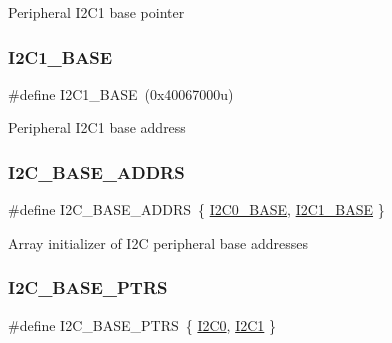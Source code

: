 Peripheral I2\+C1 base pointer \mbox{\label{group___i2_c___peripheral___access___layer_gacd72dbffb1738ca87c838545c4eb85a3}} 
\subsubsection{\texorpdfstring{I2C1\_BASE}{I2C1\_BASE}}
{\footnotesize\ttfamily \#define I2\+C1\+\_\+\+B\+A\+SE~(0x40067000u)}

Peripheral I2\+C1 base address \mbox{\label{group___i2_c___peripheral___access___layer_gae92fd6c5f532d79f1a47e76c6dbc33f0}} 
\subsubsection{\texorpdfstring{I2C\_BASE\_ADDRS}{I2C\_BASE\_ADDRS}}
{\footnotesize\ttfamily \#define I2\+C\+\_\+\+B\+A\+S\+E\+\_\+\+A\+D\+D\+RS~\{ \mbox{\hyperlink{group___i2_c___peripheral___access___layer_gabf0928baf4e4350633ca9050b65d1939}{I2\+C0\+\_\+\+B\+A\+SE}}, \mbox{\hyperlink{group___i2_c___peripheral___access___layer_gacd72dbffb1738ca87c838545c4eb85a3}{I2\+C1\+\_\+\+B\+A\+SE}} \}}

Array initializer of I2C peripheral base addresses \mbox{\label{group___i2_c___peripheral___access___layer_gaee17f364d6d1712b62774e6c33dea554}} 
\subsubsection{\texorpdfstring{I2C\_BASE\_PTRS}{I2C\_BASE\_PTRS}}
{\footnotesize\ttfamily \#define I2\+C\+\_\+\+B\+A\+S\+E\+\_\+\+P\+T\+RS~\{ \mbox{\hyperlink{group___i2_c___peripheral___access___layer_ga86abb2e8858d177c04e60c41e9242045}{I2\+C0}}, \mbox{\hyperlink{group___i2_c___peripheral___access___layer_gab45d257574da6fe1f091cc45b7eda6cc}{I2\+C1}} \}}

